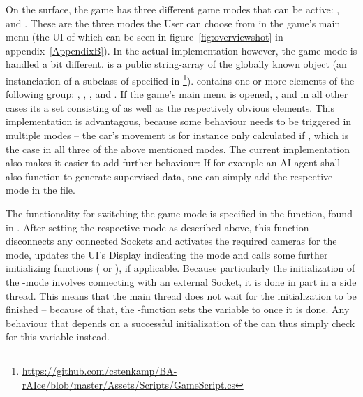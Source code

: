 On the surface, the game has three different game modes that can be active: ,  and . These are the three modes the User can choose from in the game's main menu (the UI of which can be seen in figure~\ref{fig:overviewshot} in appendix~\ref{AppendixB}). In the actual implementation however, the game mode is handled a bit different.  is a public string-array of the globally known object  (an instanciation of a subclass of  specified in \footnote{\url{https://github.com/cstenkamp/BA-rAIce/blob/master/Assets/Scripts/GameScript.cs}}\byLeon).  contains one or more elements of the following group: , , ,  and . If the game's main menu is opened, , and in all other cases its a set consisting of  as well as the respectively obvious elements. This implementation is advantagous, because some behaviour needs to be triggered in multiple modes -- the car's movement is for instance only calculated if , which is the case in all three of the above mentioned modes. The current implementation also makes it easier to add further behaviour: If for example an AI-agent shall also function to generate supervised data, one can simply add the respective mode in the  file.

The functionality for switching the game mode is specified in the  function, found in . After setting the respective mode as described above, this function disconnects any connected Sockets and  activates the required cameras for the mode, updates the UI's Display indicating the mode and calls some further initializing functions ( or ), if applicable. Because particularly the initialization of the -mode involves connecting with an external Socket, it is done in part in a side thread. This means that the main thread does not wait for the initialization to be finished -- because of that, the -function sets the variable  to  once it is done. Any behaviour that depends on a successful initialization of the can thus simply check for this variable instead.

